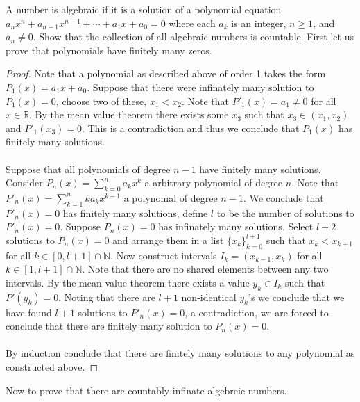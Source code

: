 \documentclass[12pt]{article}
\makeatletter
\theoremstyle{homework}
\newenvironment{exercise}[1]
{\def\@currentlabel{#1}\exercisecore}
{\endexercisecore}
\makeatother
\begin{document}
\begin{exercise}
2
A number is algebraic if it is a solution of a polynomial equation $a_nx^n + a_{n−1}x^{n−1} + \cdots + a_1x + a_0 = 0$ where each $a_k$ is an integer, $n \geq 1$, and $a_n \neq 0$. Show that the collection of all algebraic numbers is countable.
\end{exercise}
First let us prove that polynomials have finitely many zeros.
\begin{proof}
Note that a polynomial as described above of order 1 takes the form $P_1(x)=a_1x+a_0$.  Suppose that there were infinately many solution to $P_1(x)=0$, choose two of these, $x_1<x_2$.  Note that $P'_1(x)=a_1\neq 0$ for all $x\in\mathbb{R}$.  By the mean value theorem there exists some $x_3$ such that $x_3\in(x_1,x_2)$ and $P'_1(x_3)=0$.  This is a contradiction and thus we conclude that $P_1(x)$ has finitely many solutions.\\\\
Suppose that all polynomials of degree $n-1$ have finitely many solutions.  Consider $P_n(x)=\sum_{k=0}^n a_k x^k$ a arbitrary polynomial of degree $n$.  Note that $P'_n(x)=\sum_{k=1}^n ka_k x^{k-1}$ a polynomal of degree $n-1$.  We conclude that $P'_n(x)=0$ has finitely many solutions, define $l$ to be the number of solutions to $P'_n(x)=0$.  Suppose $P_n(x)=0$ has infinately many solutions.  Select $l+2$ solutions to $P_n(x)=0$ and arrange them in a list $\{x_k\}_{k=0}^{l+1}$ such that $x_k<x_{k+1}$ for all $k\in [0,l+1]\cap\mathbb{N}$.  Now construct intervals $I_k=(x_{k-1},x_k)$ for all $k\in [1,l+1]\cap\mathbb{N}$.  Note that there are no shared elements between any two intervals.  By the mean value theorem there exists a value $y_k\in I_k$ such that $P'(y_k)=0$.  Noting that there are $l+1$ non-identical $y_k$'s we conclude that we have found $l+1$ solutions to $P'_n(x)=0$, a contradiction, we are forced to conclude that there are finitely many solution to $P_n(x)=0$.\\\\
By induction conclude that there are finitely many solutions to any polynomial as constructed above.
\end{proof}
Now to prove that there are countably infinate algebreic numbers.
\end{document}

